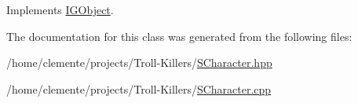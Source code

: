 Implements \hyperlink{class_i_g_object_a5092ff8b79a61c3856510adb0543f229}{I\+G\+Object}.



The documentation for this class was generated from the following files\+:\begin{DoxyCompactItemize}
\item 
/home/clemente/projects/\+Troll-\/\+Killers/\hyperlink{_s_character_8hpp}{S\+Character.\+hpp}\item 
/home/clemente/projects/\+Troll-\/\+Killers/\hyperlink{_s_character_8cpp}{S\+Character.\+cpp}\end{DoxyCompactItemize}
